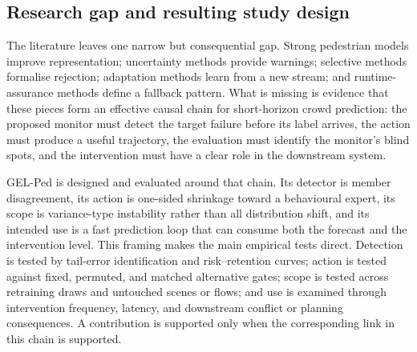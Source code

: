 \subsection{Research gap and resulting study design}

The literature leaves one narrow but consequential gap. Strong pedestrian models improve representation; uncertainty methods provide warnings; selective methods formalise rejection; adaptation methods learn from a new stream; and runtime-assurance methods define a fallback pattern. What is missing is evidence that these pieces form an effective causal chain for short-horizon crowd prediction: the proposed monitor must detect the target failure before its label arrives, the action must produce a useful trajectory, the evaluation must identify the monitor's blind spots, and the intervention must have a clear role in the downstream system.

GEL-Ped is designed and evaluated around that chain. Its detector is member disagreement, its action is one-sided shrinkage toward a behavioural expert, its scope is variance-type instability rather than all distribution shift, and its intended use is a fast prediction loop that can consume both the forecast and the intervention level. This framing makes the main empirical tests direct. Detection is tested by tail-error identification and risk--retention curves; action is tested against fixed, permuted, and matched alternative gates; scope is tested across retraining draws and untouched scenes or flows; and use is examined through intervention frequency, latency, and downstream conflict or planning consequences. A contribution is supported only when the corresponding link in this chain is supported.
